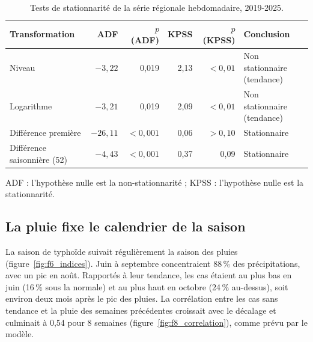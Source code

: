 \documentclass[11pt]{article}
\begin{document}
\begin{table}[!htbp]\centering\small
\caption{Tests de stationnarité de la série régionale hebdomadaire, 2019-2025.}\label{tab:stat}
\begin{tabularx}{\linewidth}{@{}L rrrr L@{}}\toprule
Transformation & ADF & $p$ (ADF) & KPSS & $p$ (KPSS) & Conclusion \\\midrule
Niveau & $-3{,}22$ & 0,019 & 2,13 & $<0{,}01$ & Non stationnaire (tendance) \\
Logarithme & $-3{,}21$ & 0,019 & 2,09 & $<0{,}01$ & Non stationnaire (tendance) \\
Différence première & $-26{,}11$ & $<0{,}001$ & 0,06 & $>0{,}10$ & Stationnaire \\
Différence saisonnière (52) & $-4{,}43$ & $<0{,}001$ & 0,37 & 0,09 & Stationnaire \\\bottomrule
\end{tabularx}
\par\smallskip\footnotesize\raggedright ADF : l'hypothèse nulle est la non-stationnarité ; KPSS : l'hypothèse nulle est la stationnarité.
\end{table}


\subsection{La pluie fixe le calendrier de la saison}
La saison de typhoïde suivait régulièrement la saison des pluies (figure~\ref{fig:f6_indices}). Juin à septembre concentraient 88\,\% des précipitations, avec un pic en août. Rapportés à leur tendance, les cas étaient au plus bas en juin (16\,\% sous la normale) et au plus haut en octobre (24\,\% au-dessus), soit environ deux mois après le pic des pluies. La corrélation entre les cas sans tendance et la pluie des semaines précédentes croissait avec le décalage et culminait à 0,54 pour 8 semaines (figure~\ref{fig:f8_correlation}), comme prévu par le modèle.


\end{document}
